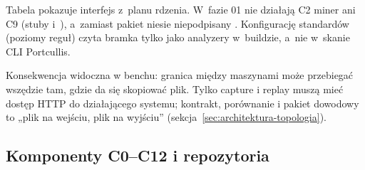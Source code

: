 Tabela pokazuje interfejs z~planu rdzenia. W~fazie 01 nie działają C2 miner ani C9
(stuby  i~), a~zamiast 
pakiet niesie niepodpisany . Konfigurację standardów (poziomy
reguł) czyta bramka tylko jako analyzery w~buildzie, a~nie w~skanie CLI Portcullis.

Konsekwencja widoczna w benchu: granica między maszynami może przebiegać wszędzie tam,
gdzie da się skopiować plik. Tylko capture i replay muszą mieć dostęp HTTP do działającego
systemu; kontrakt, porównanie i pakiet dowodowy to „plik na wejściu, plik na wyjściu”
(sekcja~\ref{sec:architektura-topologia}).


\subsection{Komponenty C0--C12 i repozytoria}\label{sec:architektura-komponenty}

